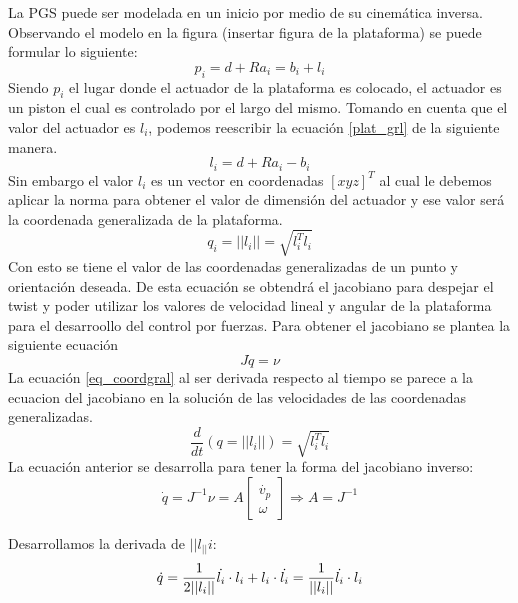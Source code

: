 La PGS puede ser modelada en un inicio por medio de su cinemática inversa. Observando el modelo en la figura (insertar figura de la plataforma) se puede formular lo siguiente:
\begin{equation} \label{plat_grl}
p_i = d + Ra_i = b_i + l_i
\end{equation}
Siendo $p_i$ el lugar donde el actuador de la plataforma es colocado, el actuador es un piston el cual es controlado por el largo del mismo. Tomando en cuenta que el valor del actuador es $l_i$, podemos reescribir la ecuación \ref{plat_grl} de la siguiente manera.
\begin{equation}
l_i = d + Ra_i - b_i
\end{equation}
Sin embargo el valor $l_i$ es un vector en coordenadas $[x y z]^T$ al cual le debemos aplicar la norma para obtener el valor de dimensión del actuador y ese valor será la coordenada generalizada de la plataforma.
\begin{equation}\label{eq_coordgral}
q_i = ||l_i|| = \sqrt{l_i^Tl_i}
\end{equation}
Con esto se tiene el valor de las coordenadas generalizadas de un punto y orientación deseada. De esta ecuación se obtendrá el jacobiano para despejar el twist y poder utilizar los valores de velocidad lineal y angular de la plataforma para el desarroollo del control por fuerzas. Para obtener el jacobiano se plantea la siguiente ecuación
\begin{equation} \label{equgral_q}
J\dot{q}=\nu
\end{equation}
La ecuación \ref{eq_coordgral} al ser derivada respecto al tiempo se parece a la ecuacion del jacobiano en la solución de las velocidades de las coordenadas generalizadas.
\begin{equation}
\frac{d}{dt}(q = ||l_i||) = \sqrt{l_i^Tl_i} 
\end{equation}
La ecuación anterior se desarrolla para tener la forma del jacobiano inverso:
\begin{equation}
\dot{q}=J^{-1} \nu = A \begin{bmatrix}
\dot{v_p}\\
\omega
\end{bmatrix} \Rightarrow A = J^{-1}
\end{equation}

Desarrollamos la derivada de $||l_||i$:
\begin{equation}
\dot{q} = \frac{1}{2||l_i||} \dot{l_i} \cdot l_i + l_i \cdot \dot{l_i} = \frac{1}{||l_i||} \dot{l_i} \cdot l_i \\ \bigskip
\end{equation}

